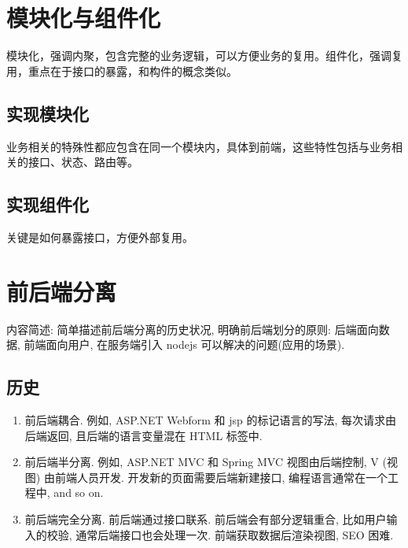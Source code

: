 \section{模块化与组件化}\label{ux6a21ux5757ux5316ux4e0eux7ec4ux4ef6ux5316}

模块化，强调内聚，包含完整的业务逻辑，可以方便业务的复用。组件化，强调复用，重点在于接口的暴露，和构件的概念类似。

\subsection{实现模块化}\label{ux5b9eux73b0ux6a21ux5757ux5316}

业务相关的特殊性都应包含在同一个模块内，具体到前端，这些特性包括与业务相关的接口、状态、路由等。

\subsection{实现组件化}\label{ux5b9eux73b0ux7ec4ux4ef6ux5316}

关键是如何暴露接口，方便外部复用。

\section{前后端分离}\label{ux524dux540eux7aefux5206ux79bb}

内容简述: 简单描述前后端分离的历史状况, 明确前后端划分的原则:
后端面向数据, 前端面向用户, 在服务端引入 nodejs
可以解决的问题(应用的场景).

\subsection{历史}\label{ux5386ux53f2}

\begin{enumerate}
\def\labelenumi{\arabic{enumi}.}
\tightlist
\item
  前后端耦合. 例如, ASP.NET Webform 和 jsp 的标记语言的写法,
  每次请求由后端返回, 且后端的语言变量混在 HTML 标签中.
\item
  前后端半分离. 例如, ASP.NET MVC 和 Spring MVC 视图由后端控制, V (视图)
  由前端人员开发. 开发新的页面需要后端新建接口,
  编程语言通常在一个工程中, and so on.
\item
  前后端完全分离. 前后端通过接口联系. 前后端会有部分逻辑重合,
  比如用户输入的校验, 通常后端接口也会处理一次. 前端获取数据后渲染视图,
  SEO 困难.
\end{enumerate}

